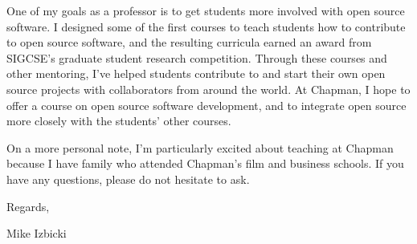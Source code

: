 \documentclass[12pt]{article}
\newcommand{\school}[2]{\textcolor{red}{\textbf{{#1}:} {#2}}}
\begin{document}
\noindent
One of my goals as a professor is to get students more involved with open source software.
I designed some of the first courses to teach students how to contribute to open source software,
and the resulting curricula earned an award from SIGCSE's graduate student research competition.
Through these courses and other mentoring, 
I've helped students contribute to and start their own open source projects with collaborators from around the world.
At Chapman, I hope to offer a course on open source software development,
and to integrate open source more closely with the students' other courses.

\noindent
On a more personal note, I'm particularly excited about teaching at Chapman because I have family who attended Chapman's film and business schools. 
If you have any questions,
please do not hesitate to ask.

\noindent
Regards,

\vspace{-0.05in}
\noindent
Mike Izbicki

%
%
%
%
%
\end{document}
